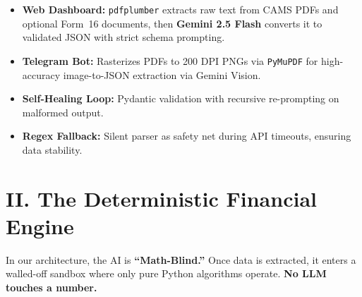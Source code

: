 \documentclass[9pt,a4paper]{article}
\begin{document}
\begin{itemize}[leftmargin=*,nosep]
    \item \textbf{Web Dashboard:} \texttt{pdfplumber} extracts raw text from CAMS PDFs and optional Form~16 documents, then \textbf{Gemini 2.5 Flash} converts it to validated JSON with strict schema prompting.
    \item \textbf{Telegram Bot:} Rasterizes PDFs to 200 DPI PNGs via \texttt{PyMuPDF} for high-accuracy image-to-JSON extraction via Gemini Vision.
    \item \textbf{Self-Healing Loop:} Pydantic validation with recursive re-prompting on malformed output.
    \item \textbf{Regex Fallback:} Silent parser as safety net during API timeouts, ensuring data stability.
\end{itemize}

\section{II. The Deterministic Financial Engine}

\small In our architecture, the AI is \textbf{``Math-Blind.''} Once data is extracted, it enters a walled-off sandbox where only pure Python algorithms operate. \textbf{No LLM touches a number.}
\end{document}
